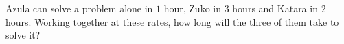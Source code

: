 Azula can solve a problem alone in $1$ hour, Zuko in $3$ hours and Katara in $2$ hours. Working together at these rates, how long will the three of them take to solve it?

